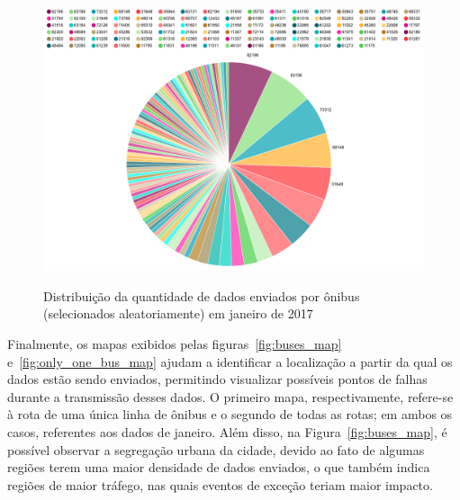 \documentclass[
	12pt,				%
	oneside,			%
	a4paper,			%
	english,			%
	brazil				%
	]{abntex2ppgsi}
\begin{document}
{{{\begin{figure}[!htb]%
	\centering
 	  \caption{Distribuição da quantidade de dados enviados por ônibus (selecionados aleatoriamente) em janeiro de 2017}
		\includegraphics[width=1\linewidth]{images/pizza_bus.png}
	\label{fig:pizza_bus}
\end{figure}

Finalmente, os mapas exibidos pelas figuras~\ref {fig:buses_map} e~\ref{fig:only_one_bus_map} ajudam a identificar a localização a partir da qual os dados estão sendo enviados, permitindo visualizar possíveis pontos de falhas durante a transmissão desses dados. O primeiro mapa, respectivamente, refere-se à rota de uma única linha de ônibus e o segundo de todas as rotas; em ambos os casos, referentes aos dados de janeiro. Além disso, na Figura~\ref {fig:buses_map}, é possível observar a segregação urbana da cidade, devido ao fato de algumas regiões terem uma maior densidade de dados enviados, o que também indica regiões de maior tráfego, nas quais eventos de exceção teriam maior impacto.

}}}
\end{document}
